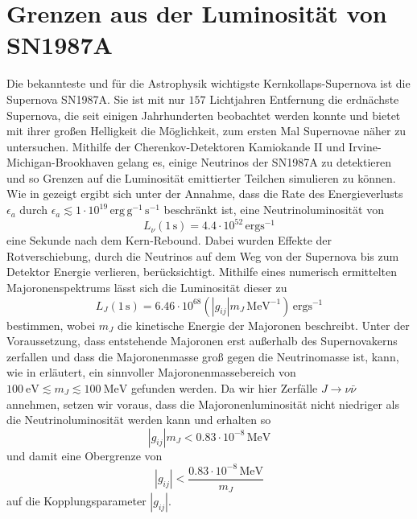 \section{Grenzen aus der Luminosität von SN1987A}

Die bekannteste und für die Astrophysik wichtigste Kernkollaps-Supernova ist die Supernova SN1987A.
Sie ist mit nur $157$ Lichtjahren Entfernung die erdnächste Supernova, die seit einigen Jahrhunderten beobachtet werden konnte und bietet mit ihrer großen Helligkeit die Möglichkeit, zum ersten Mal Supernovae näher zu untersuchen.
Mithilfe der Cherenkov-Detektoren Kamiokande II und Irvine-Michigan-Brookhaven gelang es, einige Neutrinos der SN1987A zu detektieren und so Grenzen auf die Luminosität emittierter Teilchen simulieren zu können.
Wie in \cite{neutrinolumi} gezeigt ergibt sich unter der Annahme, dass die Rate des Energieverlusts $\epsilon_a$ durch $\epsilon_a \lesssim 1 \cdot 10^{19} \,\text{erg} \,\text{g}^{-1} \,\si{\second}^{-1}$ beschränkt ist,
eine Neutrinoluminosität von
\begin{equation}
    L_\nu (1 \,\si{\second}) = \num{4.4} \cdot 10^{52} \,\text{erg} \si{\second}^{-1}
    \label{eq:neutrinolumi}
\end{equation}
eine Sekunde nach dem Kern-Rebound.
Dabei wurden Effekte der Rotverschiebung, durch die Neutrinos auf dem Weg von der Supernova bis zum Detektor Energie verlieren, berücksichtigt.
Mithilfe eines numerisch ermittelten Majoronenspektrums lässt sich die Luminosität dieser zu
\begin{equation}
    L_J (1 \,\si{\second}) = \num{6.46} \cdot 10^{68} \left(|g_{i j}| m_J \,\si{\mega\eV}^{-1} \right) \,\text{erg} \si{\second}^{-1}
\end{equation}
bestimmen, wobei $m_J$ die kinetische Energie der Majoronen beschreibt.
Unter der Voraussetzung, dass entstehende Majoronen erst außerhalb des Supernovakerns zerfallen und dass die Majoronenmasse groß gegen die Neutrinomasse ist, kann, 
wie in \cite{newlimit} erläutert, ein sinnvoller Majoronenmassebereich von $\SI{100}{\eV} \lesssim m_J \lesssim \SI{100}{\mega\eV}$ gefunden werden.
Da wir hier Zerfälle $J \rightarrow \nu \bar{\nu}$ annehmen, setzen wir voraus, dass die Majoronenluminosität nicht niedriger als die Neutrinoluminosität werden kann und erhalten so
\begin{equation*}
    |g_{i j}| m_J < \num{0.83} \cdot 10^{-8} \,\si{\mega\eV}
\end{equation*}
und damit eine Obergrenze von
\begin{equation}
    |g_{ij}| < \frac{\num{0.83} \cdot 10^{-8} \,\si{\mega\eV}}{m_J}
    \label{eq:gijlimit}
\end{equation}
auf die Kopplungsparameter $|g_{i j}|$.


